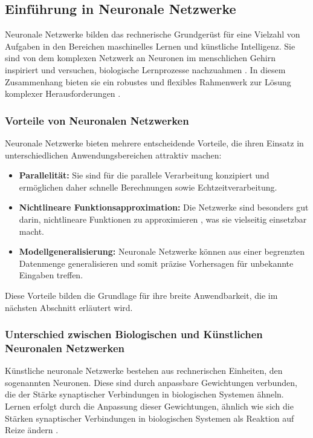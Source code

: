 \subsection{Einführung in Neuronale Netzwerke}
Neuronale Netzwerke bilden das rechnerische Grundgerüst für eine Vielzahl von Aufgaben in den Bereichen maschinelles Lernen und künstliche Intelligenz. Sie sind von dem komplexen Netzwerk an Neuronen im menschlichen Gehirn inspiriert und versuchen, biologische Lernprozesse nachzuahmen \cite[p.~21]{aggarwal_neural_networks_2018}. In diesem Zusammenhang bieten sie ein robustes und flexibles Rahmenwerk zur Lösung komplexer Herausforderungen \cite[p.~29]{Goodfellow-et-al-2016}.

\subsubsection{Vorteile von Neuronalen Netzwerken}
Neuronale Netzwerke bieten mehrere entscheidende Vorteile, die ihren Einsatz in unterschiedlichen Anwendungsbereichen attraktiv machen:
\begin{itemize}
    \item \textbf{Parallelität:} Sie sind für die parallele Verarbeitung konzipiert und ermöglichen daher schnelle Berechnungen sowie Echtzeitverarbeitung.
    \item \textbf{Nichtlineare Funktionsapproximation:} Die Netzwerke sind besonders gut darin, nichtlineare Funktionen zu approximieren \cite[p.~214]{Goodfellow-et-al-2016}, was sie vielseitig einsetzbar macht.
    \item \textbf{Modellgeneralisierung:} Neuronale Netzwerke können aus einer begrenzten Datenmenge generalisieren und somit präzise Vorhersagen für unbekannte Eingaben treffen.
\end{itemize}
Diese Vorteile bilden die Grundlage für ihre breite Anwendbarkeit, die im nächsten Abschnitt erläutert wird.

\subsubsection{Unterschied zwischen Biologischen und Künstlichen Neuronalen Netzwerken}
Künstliche neuronale Netzwerke bestehen aus rechnerischen Einheiten, den sogenannten Neuronen. Diese sind durch anpassbare Gewichtungen verbunden, die der Stärke synaptischer Verbindungen in biologischen Systemen ähneln. Lernen erfolgt durch die Anpassung dieser Gewichtungen, ähnlich wie sich die Stärken synaptischer Verbindungen in biologischen Systemen als Reaktion auf Reize ändern \cite[p.~21]{aggarwal_neural_networks_2018}.

